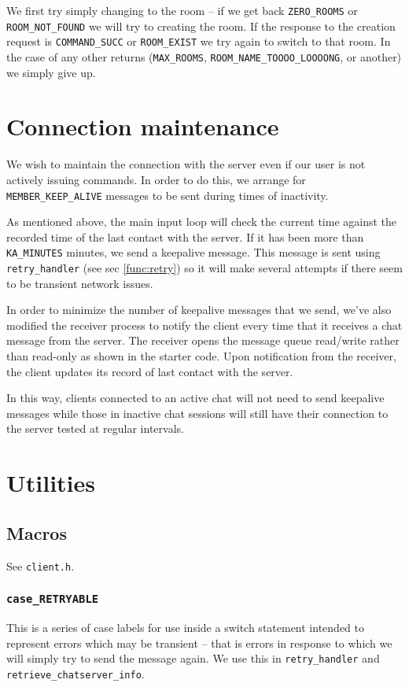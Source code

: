 \documentclass[12pt]{article}
\newcommand{\mono}[1]{\texttt{#1}}
\begin{document}
We first try simply changing to
the room -- if we get back \mono{ZERO\_ROOMS} or \mono{ROOM\_NOT\_FOUND} we will
try to creating the room. If the response to the creation request is
\mono{COMMAND\_SUCC} or \mono{ROOM\_EXIST} we try again to switch to that room.
In the case of any other returns (\mono{MAX\_ROOMS},
\mono{ROOM\_NAME\_TOOOO\_LOOOONG}, or another) we simply give up.

\section{Connection maintenance}
\label{sec:keepalive}
We wish to maintain the connection with the server even if our user is not
actively issuing commands. In order to do this, we arrange for 
\mono{MEMBER\_KEEP\_ALIVE} messages to be sent during times of inactivity.

As mentioned above, the main input loop will check the current time
against the recorded time of the last contact with the server. If it has
been more than \mono{KA\_MINUTES} minutes, we send a keepalive message.
This message
is sent using \mono{retry\_handler} (see sec \ref{func:retry}) so it will make
several attempts if there seem to be transient network issues.

In order to minimize the number of keepalive messages that we send, we've
also modified the receiver process to notify the client every time that it
receives a chat message from the server. The receiver opens the message queue
read/write rather than read-only as shown in the starter code.
Upon notification from the receiver, the client updates its record of last
contact with the server.

In this way, clients connected to an active chat will not need to send 
keepalive messages while those in inactive chat sessions will still have their
connection to the server tested at regular intervals.

\section{Utilities}
\label{sec:util}

\subsection{Macros}
See \mono{client.h}.

\subsubsection{\mono{case\_RETRYABLE}}
\label{def:case}
This is a series of case labels for use inside a switch statement intended
to represent errors which may be transient -- that is errors in response to
which we will simply try to send the message again. We use this in
\mono{retry\_handler} and \mono{retrieve\_chatserver\_info}.
\end{document}

